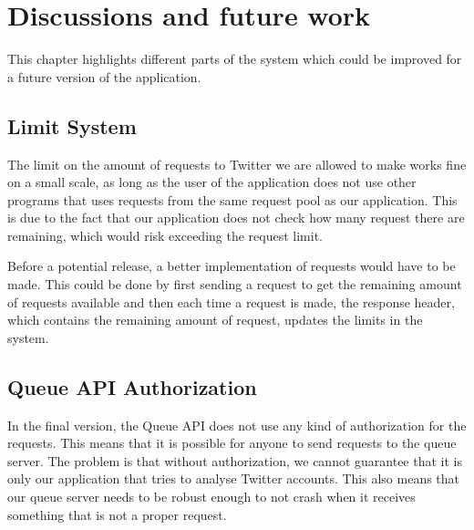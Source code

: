 \chapter{Discussions and future work}\label{fwork}
This chapter highlights different parts of the system which could
be improved for a future version of the application.

\section*{Limit System}
The limit on the amount of requests to Twitter we are allowed to make works fine
on a small scale, as long as the user of the application does not use other
programs that uses requests from the same request pool as our application. This
is due to the fact that our application does not check how many request there
are remaining, which would risk exceeding the request limit. \nl

Before a potential release, a better implementation of requests would have to be
made. This could be done by first sending a request to get the remaining amount
of requests available and then each time a request is made, the response
header, which contains the remaining amount of request, updates the
limits in the system.\nl


{}

\section*{Queue API Authorization}
In the final version, the Queue API does not use any kind of authorization for
the requests. This means that it is possible for anyone to send requests to the
queue server. The problem is that without authorization, we cannot guarantee
that it is only our application that tries to analyse Twitter accounts. This
also means that our queue server needs to be robust enough to not crash when it
receives something that is not a proper request. \nl

